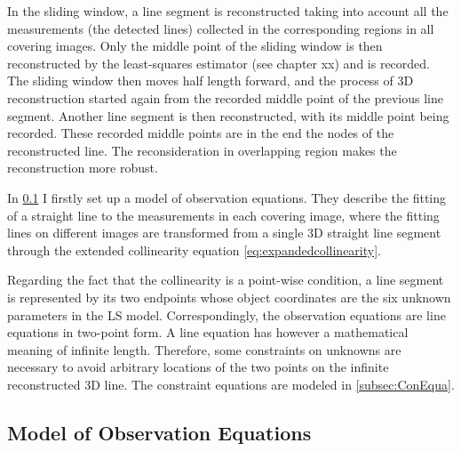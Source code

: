 In the sliding window, a line segment is reconstructed taking into account all the measurements (the detected lines) collected in the corresponding regions in all covering images. Only the middle point of the sliding window is then reconstructed by the least-squares estimator (see chapter xx) %
and is recorded. The sliding window then moves half length forward, and the process of 3D reconstruction started again from the recorded middle point of the previous line segment. Another line segment is then reconstructed, with its middle point being recorded. These recorded middle points are in the end the nodes of the reconstructed line. The reconsideration in overlapping region makes the reconstruction more robust.

In \cref{subsec:ObsEqua} I firstly set up a model of observation equations. They describe the fitting of a straight line to the measurements in each covering image, where the fitting lines on different images are transformed from a single 3D straight line segment through the extended collinearity equation \eqref{eq:expandedcollinearity}.

Regarding the fact that the collinearity is a point-wise condition, a line segment is represented by its two endpoints whose object coordinates are the six unknown parameters %
in the LS model. %
Correspondingly, the observation equations are line equations in two-point form. A line equation has however a mathematical meaning of infinite length. Therefore, some constraints on unknowns are necessary to avoid arbitrary locations of the two points on the infinite reconstructed 3D line. The constraint equations are modeled in \cref{subsec:ConEqua}.






\subsection{Model of Observation Equations}
\label{subsec:ObsEqua}

